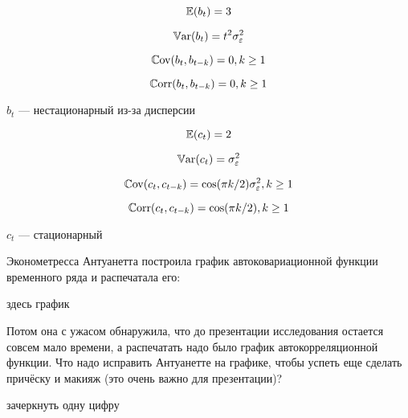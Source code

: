 \begin{problem}
\begin{sol}

\[
\operatorname{\mathbb{E}}(b_t) = 3
\]

\[
\operatorname{\mathbb{V}\mathrm{ar}}(b_t) = t^2 \sigma^2_{\varepsilon}
\]

\[
\operatorname{\mathbb{C}\mathrm{ov}}(b_t, b_{t-k}) = 0, k \geq 1
\]

\[
\operatorname{\mathbb{C}\mathrm{orr}}(b_t, b_{t-k}) = 0, k \geq 1
\]

$b_t$ — нестационарный из-за дисперсии


\[
\operatorname{\mathbb{E}}(c_t) = 2
\]

\[
\operatorname{\mathbb{V}\mathrm{ar}}(c_t) = \sigma^2_{\varepsilon}
\]

\[
\operatorname{\mathbb{C}\mathrm{ov}}(c_t, c_{t-k}) = \cos( \pi k /2)\sigma^2_{\varepsilon}, k \geq 1
\]

\[
\operatorname{\mathbb{C}\mathrm{orr}}(c_t, c_{t-k}) = \cos( \pi k /2), k \geq 1
\]

$c_t$ — стационарный
\end{sol}
\end{problem}





\begin{problem}
Эконометресса Антуанетта построила график автоковариационной функции временного ряда и распечатала его:

здесь график

Потом она с ужасом обнаружила, что до презентации исследования остается совсем мало времени, а распечатать надо было график автокорреляционной функции. Что надо исправить Антуанетте на графике, чтобы успеть еще сделать причёску и макияж (это очень важно для презентации)?



\begin{sol}
зачеркнуть одну цифру
\end{sol}
\end{problem}


